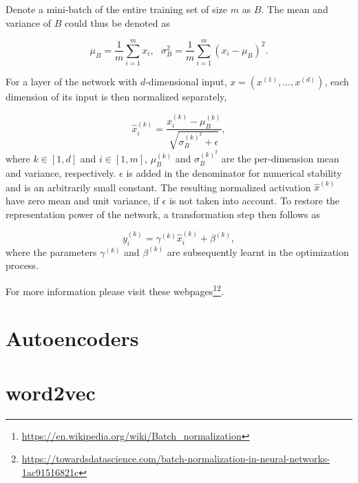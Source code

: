 \documentclass[12pt]{article}
\theoremstyle{plain}
\begin{document}
Denote a mini-batch of the entire training set of size $m$ as $B$. The mean and variance of $B$ could thus be denoted as

\begin{equation}
\mu_B = \frac{1}{m} \sum_{i=1}^m x_i,~~~ \sigma_B^2 = \frac{1}{m} \sum_{i=1}^m (x_i-\mu_B)^2.
\end{equation}

For a layer of the network with $d$-dimensional input, $x = (x^{(1)},...,x^{(d)})$, each dimension of its input is then normalized separately,

\begin{equation}
\hat{x}_{i}^{(k)} = \frac {x_i^{(k)}-\mu_B^{(k)}}{ \sqrt{\sigma_B^{(k)^2}+\epsilon}},
\end{equation}
where $k \in [1,d]$ and $i \in [1,m]$, $\mu_B^{(k)}$ and $\sigma_B^{(k)^2}$ are the per-dimension mean and variance, respectively. $\epsilon$ is added in the denominator for numerical stability and is an arbitrarily small constant. The resulting normalized activation $\hat{x}^{(k)}$ have zero mean and unit variance, if $\epsilon$ is not taken into account. To restore the representation power of the network, a transformation step then follows as

\begin{equation}
y_i^{(k)} = \gamma^{(k)} \hat{x}_{i}^{(k)} +\beta^{(k)},
\end{equation}
where the parameters $\gamma^{(k)}$ and $\beta^{(k)}$ are subsequently learnt in the optimization process.

For more information please visit these webpages\footnote{\url{https://en.wikipedia.org/wiki/Batch_normalization}}\footnote{\url{https://towardsdatascience.com/batch-normalization-in-neural-networks-1ac91516821c}}.

\section{Autoencoders}


\section{word2vec}

\newpage
\end{document}
